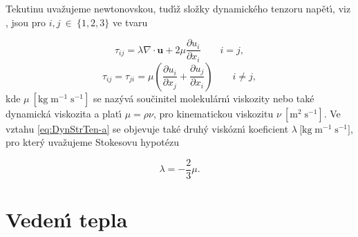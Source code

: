         Tekutinu uva\v{z}ujeme newtonovskou, tud\'{\i}\v{z} slo\v{z}ky dynamick\'eho tenzoru nap\v{e}t\'{\i}, viz \cite{landau2013fluid}, jsou pro $i, j~\in~\{ 1{,}2{,}3 \}$ ve tvaru
        
        \begin{equation}
        \label{eq:DynStrTen-a}
            \tau_{ij} = \lambda\nabla \cdot \boldsymbol{u} + 2\mu\frac{\partial u_i}{\partial x_i} \qquad i = j,
        \end{equation}
        \begin{equation}
        \label{eq:DynStrTen-b}
            \tau_{ij} = \tau_{ji} = \mu\left(\frac{\partial u_i}{\partial x_j} + \frac{\partial u_j}{\partial x_i}\right) \qquad i \neq j,
        \end{equation}
        kde $\mu \ [\mathrm{kg \; m^{-1} \; s^{-1}}]$ se naz\'yv\'a sou\v{c}initel molekul\'arn\'{\i} viskozity nebo tak\'e dynamick\'a viskozita a plat\'{\i} $\mu = \rho \nu$, pro kinematickou viskozitu $\nu \ [\mathrm{m^{2} \; s^{-1}}]$. Ve vztahu \eqref{eq:DynStrTen-a} se objevuje tak\'{e} druh\'y visk\'ozn\'{\i} koeficient $\lambda \ [\mathrm{ kg \; m^{-1} \; s^{-1} ]}$, pro kter\'y uva\v{z}ujeme Stokesovu hypot\'ezu \cite{buresti2015note}
        
        \begin{equation}
        \label{eq:StoHyp}
            \lambda = - \frac{2}{3}\mu. 
        \end{equation}
        

    \section{Veden\'{\i} tepla}
    \label{sec:HeatTransfer}

